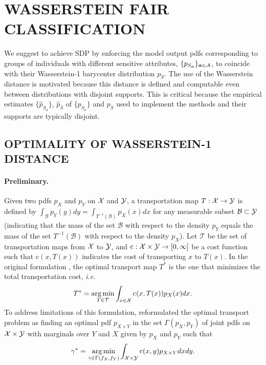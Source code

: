 \documentclass[letterpaper]{article}
\newcommand{\ie}{\emph{i.e.}}
\theoremstyle{definition}
\newcommand{\Sa}{S_{\va}}
\newcommand{\bS}{\bar{S}}
\newcommand{\tc}{\textrm{c}}
\begin{document}
\section{WASSERSTEIN FAIR CLASSIFICATION}
\vskip-0.2cm
We suggest to achieve SDP by enforcing the model output pdfs corresponding to groups of individuals with different sensitive attributes, $\{p_{\Sa}\}_{\va\in \mathcal{A}}$,  to coincide with their Wasserstein-1 barycenter distribution $p_{\bS}$. 
The use of the Wasserstein distance is motivated because this distance is defined and computable even between distributions with disjoint supports. This is critical because the empirical estimates $\{\hat{p}_{S_a}\}$, $\hat{p}_{\bS}$ of 
$\{p_{S_a}\}$ and $p_{\bS}$ used to implement the methods and their supports are typically disjoint.

\subsection{OPTIMALITY OF WASSERSTEIN-1 DISTANCE\label{sec:optimality}}
\paragraph{Preliminary.} Given two pdfs $p_{X}$ and $p_{Y}$ on ${\cal X}$ and ${\cal Y}$, a transportation map $T: {\cal X}\rightarrow {\cal Y}$ is defined by $\int_{\mathcal{B}}p_{Y}(y)dy = \int_{T^{-1}(\mathcal{B})}p_{X}(x)dx$ for any measurable subset $\mathcal{B}\subset {\cal Y}$ (indicating that the mass of the set $\mathcal{B}$ with respect to the density $p_Y$ equals the mass of the set $T^{-1}(\mathcal{B})$ with respect to the density $p_{X}$). Let $\mathcal{T}$ be the set of transportation maps from ${\cal X}$ to ${\cal Y}$, and $\tc:{\cal X}\times {\cal Y}\rightarrow[0,\infty]$ be a cost function such that $\tc(x, T(x))$ indicates the cost of transporting $x$ to $T(x)$. In the original formulation \citep{monge81memoire}, the optimal transport map $T^*$ is the one that minimizes the total transportation cost, \ie 
\[
T^* = \argmin_{T\in\mathcal{T}} \int_{x\in {\cal X}} \tc(x, T(x)) p_{X}(x) dx.
\]
To address limitations of this formulation, \citet{kantorovich42on} reformulated the optimal transport problem as finding an optimal pdf $p_{X\times Y}$ in 
the set $\Gamma(p_X, p_Y)$ of joint pdfs on ${\cal X}\times {\cal Y}$ with marginals over $Y$ and $X$ given by $p_X$ and $p_Y$ such that
\[
\gamma^* = \argmin_{\gamma\in\Gamma(f_X, f_Y)} \int_{{\cal X}\times {\cal Y}} \tc(x, y) p_{X\times Y}dxdy.
\]
\end{document}
